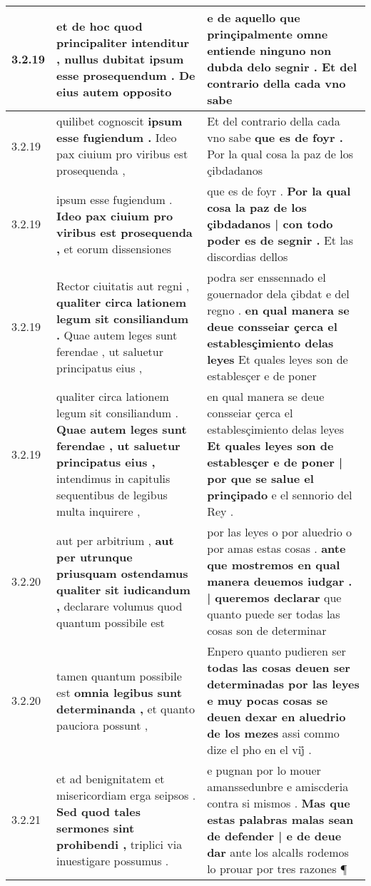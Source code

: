 \begin{tabular}{|p{1cm}|p{6.5cm}|p{6.5cm}|}
3.2.19 & et de hoc quod principaliter intenditur , \textbf{ nullus dubitat ipsum esse prosequendum . } De eius autem opposito & e de aquello que prinçipalmente omne entiende ninguno \textbf{ non dubda delo segnir . } Et del contrario della cada vno sabe \\\hline
3.2.19 & quilibet cognoscit \textbf{ ipsum esse fugiendum . } Ideo pax ciuium pro viribus est prosequenda , & Et del contrario della cada vno sabe \textbf{ que es de foyr . } Por la qual cosa la paz de los çibdadanos \\\hline
3.2.19 & ipsum esse fugiendum . \textbf{ Ideo pax ciuium pro viribus est prosequenda , } et eorum dissensiones & que es de foyr . \textbf{ Por la qual cosa la paz de los çibdadanos | con todo poder es de segnir . } Et las discordias dellos \\\hline
3.2.19 & Rector ciuitatis aut regni , \textbf{ qualiter circa lationem legum sit consiliandum . } Quae autem leges sunt ferendae , ut saluetur principatus eius , & podra ser enssennado el gouernador dela çibdat e del regno . \textbf{ en qual manera se deue consseiar çerca el establesçimiento delas leyes } Et quales leyes son de establesçer e de poner \\\hline
3.2.19 & qualiter circa lationem legum sit consiliandum . \textbf{ Quae autem leges sunt ferendae , ut saluetur principatus eius , } intendimus in capitulis sequentibus de legibus multa inquirere , & en qual manera se deue consseiar çerca el establesçimiento delas leyes \textbf{ Et quales leyes son de establesçer e de poner | por que se salue el prinçipado } e el sennorio del Rey . \\\hline
3.2.20 & aut per arbitrium , \textbf{ aut per utrunque priusquam ostendamus qualiter sit iudicandum , } declarare volumus quod quantum possibile est & por las leyes o por aluedrio o por amas estas cosas . \textbf{ ante que mostremos en qual manera deuemos iudgar . | queremos declarar } que quanto puede ser todas las cosas son de determinar \\\hline
3.2.20 & tamen quantum possibile est \textbf{ omnia legibus sunt determinanda , } et quanto pauciora possunt , & Enpero quanto pudieren ser \textbf{ todas las cosas deuen ser determinadas por las leyes e muy pocas cosas se deuen dexar en aluedrio de los mezes } assi commo dize el pho en el vij̊ . \\\hline
3.2.21 & et ad benignitatem et misericordiam erga seipsos . \textbf{ Sed quod tales sermones sint prohibendi , } triplici via inuestigare possumus . & e pugnan por lo mouer amanssedunbre e amiscderia contra si mismos . \textbf{ Mas que estas palabras malas sean de defender | e de deue dar } ante los alcalłs rodemos lo prouar por tres razones ¶ \\\hline

\end{tabular}
